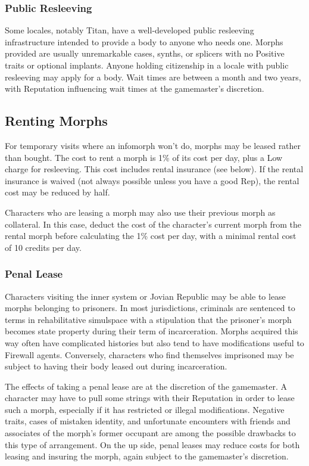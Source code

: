 \subsubsection{Public Resleeving}

Some locales, notably Titan, have a well-developed 
public resleeving infrastructure intended to provide a 
body to anyone who needs one. Morphs provided are 
usually unremarkable cases, synths, or splicers with 
no Positive traits or optional implants. Anyone holding
citizenship in a locale with public resleeving may
apply for a body. Wait times are between a month and 
two years, with Reputation influencing wait times at 
the gamemaster's discretion.

\subsection{Renting Morphs}

For temporary visits where an infomorph won't do, 
morphs may be leased rather than bought. The cost 
to rent a morph is 1\% of its cost per day, plus a Low 
charge for resleeving. This cost includes rental insurance
(see below). If the rental insurance is waived
(not always possible unless you have a good Rep), the 
rental cost may be reduced by half.

Characters who are leasing a morph may also use 
their previous morph as collateral. In this case, deduct 
the cost of the character's current morph from the 
rental morph before calculating the 1\% cost per day, 
with a minimal rental cost of 10 credits per day.

\subsubsection{Penal Lease}

Characters visiting the inner system or Jovian 
Republic may be able to lease morphs belonging 
to prisoners. In most jurisdictions, criminals are 
sentenced to terms in rehabilitative simulspace with 
a stipulation that the prisoner's morph becomes 
state property during their term of incarceration. 
Morphs acquired this way often have complicated 
histories but also tend to have modifications useful 
to Firewall agents. Conversely, characters who find 
themselves imprisoned may be subject to having 
their body leased out during incarceration.

The effects of taking a penal lease are at the discretion
of the gamemaster. A character may have
to pull some strings with their Reputation in order 
to lease such a morph, especially if it has restricted 
or illegal modifications. Negative traits, cases of 
mistaken identity, and unfortunate encounters with 
friends and associates of the morph's former occupant
are among the possible drawbacks to this
type of arrangement. On the up side, penal leases 
may reduce costs for both leasing and insuring the 
morph, again subject to the gamemaster's discretion.

